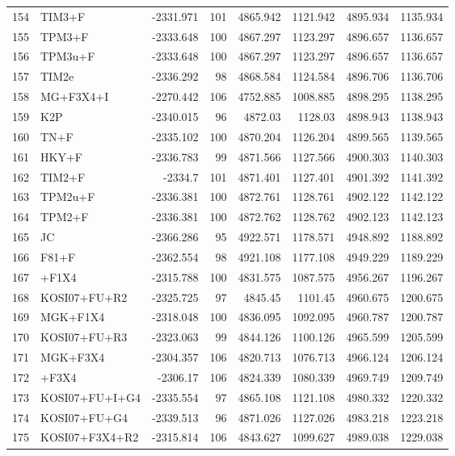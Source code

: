 \begin{longtable}{clrrrrrr}
	154 & TIM3+F & -2331.971 & 101 & 4865.942 & 1121.942 & 4895.934 & 1135.934 \\ 
	155 & TPM3+F & -2333.648 & 100 & 4867.297 & 1123.297 & 4896.657 & 1136.657 \\ 
	156 & TPM3u+F & -2333.648 & 100 & 4867.297 & 1123.297 & 4896.657 & 1136.657 \\ 
	157 & TIM2e & -2336.292 & 98 & 4868.584 & 1124.584 & 4896.706 & 1136.706 \\ 
	158 & MG+F3X4+I & -2270.442 & 106 & 4752.885 & 1008.885 & 4898.295 & 1138.295 \\ 
	159 & K2P & -2340.015 & 96 & 4872.03 & 1128.03 & 4898.943 & 1138.943 \\ 
	160 & TN+F & -2335.102 & 100 & 4870.204 & 1126.204 & 4899.565 & 1139.565 \\ 
	161 & HKY+F & -2336.783 & 99 & 4871.566 & 1127.566 & 4900.303 & 1140.303 \\ 
	162 & TIM2+F & -2334.7 & 101 & 4871.401 & 1127.401 & 4901.392 & 1141.392 \\ 
	163 & TPM2u+F & -2336.381 & 100 & 4872.761 & 1128.761 & 4902.122 & 1142.122 \\ 
	164 & TPM2+F & -2336.381 & 100 & 4872.762 & 1128.762 & 4902.123 & 1142.123 \\ 
	165 & JC & -2366.286 & 95 & 4922.571 & 1178.571 & 4948.892 & 1188.892 \\ 
	166 & F81+F & -2362.554 & 98 & 4921.108 & 1177.108 & 4949.229 & 1189.229 \\ 
	167 & \gy+F1X4 & -2315.788 & 100 & 4831.575 & 1087.575 & 4956.267 & 1196.267 \\ 
	168 & KOSI07+FU+R2 & -2325.725 & 97 & 4845.45 & 1101.45 & 4960.675 & 1200.675 \\ 
	169 & MGK+F1X4 & -2318.048 & 100 & 4836.095 & 1092.095 & 4960.787 & 1200.787 \\ 
	170 & KOSI07+FU+R3 & -2323.063 & 99 & 4844.126 & 1100.126 & 4965.599 & 1205.599 \\ 
	171 & MGK+F3X4 & -2304.357 & 106 & 4820.713 & 1076.713 & 4966.124 & 1206.124 \\ 
	172 & \gy+F3X4 & -2306.17 & 106 & 4824.339 & 1080.339 & 4969.749 & 1209.749 \\ 
	173 & KOSI07+FU+I+G4 & -2335.554 & 97 & 4865.108 & 1121.108 & 4980.332 & 1220.332 \\ 
	174 & KOSI07+FU+G4 & -2339.513 & 96 & 4871.026 & 1127.026 & 4983.218 & 1223.218 \\ 
	175 & KOSI07+F3X4+R2 & -2315.814 & 106 & 4843.627 & 1099.627 & 4989.038 & 1229.038 \\ 

\end{longtable}
